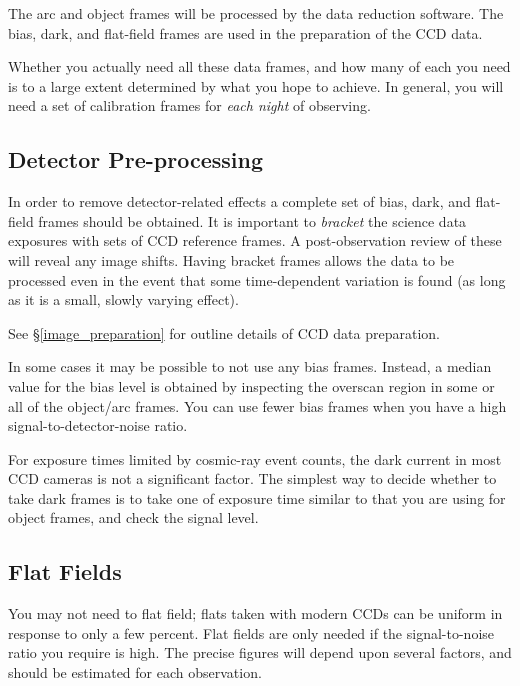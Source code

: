 \documentclass[twoside,11pt]{article}
\newcommand{\htmlref}[2]{#1}
\newcommand{\xlabel}[1]{}
\newcommand{\mlabel}[1]{\xlabel{#1}\label{#1}}
\newcommand{\scspec}[2]{#1}
\newcommand{\scspec}[2]{#2}
\begin{document}
The arc and object frames will be processed by the data reduction software.
The bias, dark, and flat-field frames are used in the preparation of the
\htmlref{CCD}{gl_ccd} data.

Whether you actually need all these data frames, and how many of each
you need is to a large extent determined by what you hope to achieve.
In general, you will need a set of calibration frames for {\em each
night} of observing.


\subsection{Detector Pre-processing}

In order to remove detector-related effects a complete set of
\htmlref{bias}{gl_bias_frame}, \htmlref{dark}{gl_dark_frame},
and
\htmlref{flat-field}{gl_flat_field} frames should be obtained.
It is important to {\em
\htmlref{bracket}{gl_bracketing}} the science data exposures with
sets of \htmlref{CCD}{gl_ccd}
reference frames.  A post-observation review of these will reveal
any image shifts.  Having bracket frames allows the data to be
processed even in the event that some time-dependent variation
is found (as long as it is a small, slowly varying effect).

See \scspec{\S\ref{image_preparation}}
{\htmlref{{\sl Image Preparation}}{image_preparation}}
for outline details of CCD data preparation.

In some cases it may be possible to not use any
\htmlref{bias frames}{gl_bias_frame}.  Instead,
a median value for the bias level is obtained by inspecting the
\htmlref{overscan region}{gl_overscan} in some or all of the
object/arc frames.
You can use fewer bias frames when you have a high
signal-to-detector-noise ratio.

For exposure times limited by \htmlref{cosmic-ray event}{gl_cosmic_ray}
counts, the \htmlref{dark current}{gl_dark_current} in most CCD cameras
is not a significant factor.
The simplest way to decide whether to take dark frames is to take one
of exposure time similar to that you are using for object frames, and
check the signal level.


\subsection{\mlabel{flat_intro}Flat Fields}

You may not need to \htmlref{flat field}{gl_flat_field};
flats taken with modern \htmlref{CCDs}{gl_ccd} can be
uniform in response to only a few percent.
Flat fields are only needed if the signal-to-noise ratio
you require is high.
The precise figures will depend upon several factors,
and should be estimated for each observation.
\end{document}
